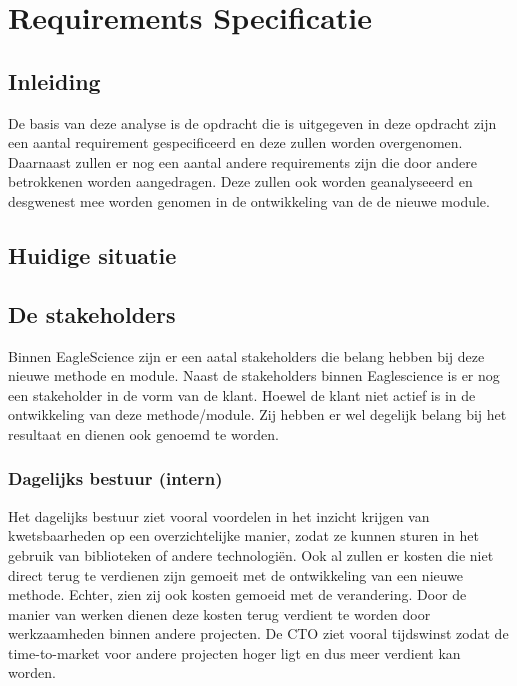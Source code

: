 
\chapter{Requirements Specificatie}\label{ch:requirements-specificatie}


\section{Inleiding}\label{sec:RS_inleiding}
De basis van deze analyse is de opdracht die is uitgegeven in deze opdracht zijn een aantal requirement gespecificeerd en deze zullen worden overgenomen. Daarnaast zullen er nog een aantal andere requirements zijn die door andere betrokkenen worden aangedragen. Deze zullen ook worden geanalyseeerd en desgwenest mee worden genomen in de ontwikkeling van de de nieuwe module.

\section{Huidige situatie}\label{sec:huidige-situatie}

\section{De stakeholders}\label{sec:de-stakeholders}
Binnen EagleScience zijn er een aatal stakeholders die belang hebben bij deze nieuwe methode en module. Naast de stakeholders binnen Eaglescience is er nog een stakeholder in de vorm van de klant. Hoewel de klant niet actief is in de ontwikkeling van deze methode/module. Zij hebben er wel degelijk belang bij het resultaat en dienen ook genoemd te worden.
\subsection{Dagelijks bestuur (intern)}\label{subsec:dagelijks-bestuur-(intern)}
Het dagelijks bestuur ziet vooral voordelen in het inzicht krijgen van kwetsbaarheden op een overzichtelijke manier, zodat ze kunnen sturen in het gebruik van biblioteken of andere technologiën. Ook al zullen er kosten die niet direct terug te verdienen zijn gemoeit met de ontwikkeling van een nieuwe methode.
Echter, zien zij ook kosten gemoeid met de verandering.
Door de manier van werken dienen deze kosten terug verdient te worden door werkzaamheden binnen andere projecten.
De CTO ziet vooral tijdswinst zodat de time-to-market voor andere projecten hoger ligt en dus meer verdient kan worden.
